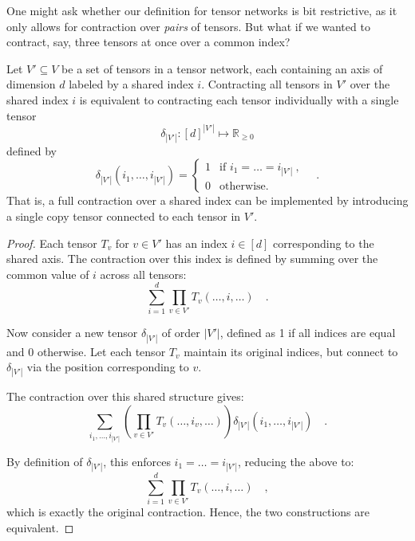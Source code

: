 \documentclass[../../main.tex]{subfiles}
\begin{document}
    One might ask whether our definition for tensor networks is bit restrictive, as it only allows for contraction over \emph{pairs} of tensors. But what if we wanted to contract, say, three tensors at once over a common index?

    \begin{proposition}
        \label{proposition:contracting_over_shared_index}
        Let $V' \subseteq V$ be a set of tensors in a tensor network, each containing an axis of dimension $d$ labeled by a shared index $i$. Contracting all tensors in $V'$ over the shared index $i$ is equivalent to contracting each tensor individually with a single tensor 
        \[
        \delta_{|V'|} : [d]^{|V'|} \mapsto \mathbb{R}_{\geq 0}
        \]
        defined by
        \[
        \delta_{|V'|}(i_1, \dots, i_{|V'|}) = 
        \begin{cases}
        1 & \text{if } i_1 = \dots = i_{|V'|} \ , \\
        0 & \text{otherwise.}
        \end{cases}
        \quad .
        \]
        That is, a full contraction over a shared index can be implemented by introducing a single copy tensor connected to each tensor in $V'$.
    \end{proposition}

    \begin{proof}
    Each tensor $T_v$ for $v \in V'$ has an index \( i \in [d] \) corresponding to the shared axis. The contraction over this index is defined by summing over the common value of \( i \) across all tensors:
    \[
    \sum_{i=1}^d \prod_{v \in V'} T_v(\dots, i, \dots) \quad .
    \]

    Now consider a new tensor \( \delta_{|V'|} \) of order \( |V'| \), defined as 1 if all indices are equal and 0 otherwise. Let each tensor \( T_v \) maintain its original indices, but connect to \( \delta_{|V'|} \) via the position corresponding to \( v \).

    The contraction over this shared structure gives:
    \[
    \sum_{i_1, \dots, i_{|V'|}} \left( \prod_{v \in V'} T_v(\dots, i_v, \dots) \right) \delta_{|V'|}(i_1, \dots, i_{|V'|}) \quad .
    \]

    By definition of \( \delta_{|V'|} \), this enforces \( i_1 = \dots = i_{|V'|} \), reducing the above to:
    \[
    \sum_{i=1}^d \prod_{v \in V'} T_v(\dots, i, \dots) \quad ,
    \]
    which is exactly the original contraction. Hence, the two constructions are equivalent.
    \end{proof}
\end{document}
